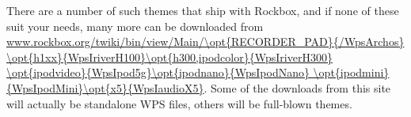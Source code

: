 There are a number of such themes that ship with Rockbox, and if none of
these suit your needs, many more can be downloaded from 
\url{www.rockbox.org/twiki/bin/view/Main/\opt{RECORDER_PAD}{/WpsArchos}
\opt{h1xx}{WpsIriverH100}\opt{h300,ipodcolor}{WpsIriverH300}
\opt{ipodvideo}{WpsIpod5g}\opt{ipodnano}{WpsIpodNano}
\opt{ipodmini}{WpsIpodMini}\opt{x5}{WpsIaudioX5}}. 
Some of the downloads from this site will actually be standalone WPS files, 
others will be full-blown themes. 


